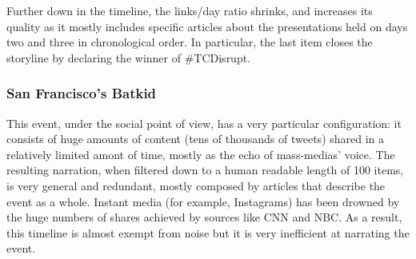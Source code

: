 \documentclass{sig-alternate}
\begin{document}
Further down in the timeline, the links/day ratio shrinks, and increases its quality as it mostly includes specific articles about the presentations held on days two and three in chronological order. In particular, the last item closes the storyline by declaring the winner of \#TCDisrupt.

\subsubsection{San Francisco's Batkid}
This event, under the social point of view, has a very particular configuration: it consists of huge amounts of content (tens of thousands of tweets) shared in a relatively limited amont of time, mostly as the echo of mass-medias' voice. The resulting narration, when filtered down to a human readable length of 100 items, is very general and redundant, mostly composed by articles that describe the event as a whole. Instant media (for example, Instagrams) has been drowned by the huge numbers of shares achieved by sources like CNN and NBC. As a result, this timeline is almost exempt from noise but it is very inefficient at narrating the event.
\end{document}
